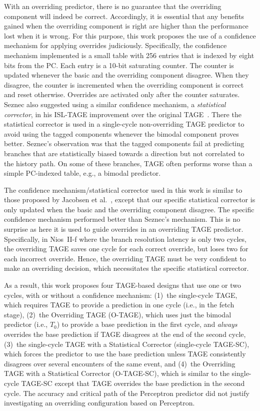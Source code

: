 \documentclass[conference]{IEEEtran}
\begin{document}
With an overriding predictor, there is no guarantee that the overriding component will indeed be correct. Accordingly, it is essential that any benefits gained when the overriding component is right are higher than the performance lost when it is wrong. For this purpose, this work proposes the use of a confidence mechanism for applying overrides judiciously. Specifically, the confidence mechanism implemented is a small table with 256 entries that is indexed by eight bits from the PC. Each entry is a 10-bit saturating counter.  The counter is updated whenever the basic and the overriding component disagree. When they disagree, the counter is incremented when the overriding component is correct and reset otherwise. Overrides are activated only after the counter saturates. Seznec also suggested using a similar confidence mechanism, a \textit{statistical corrector}, in his ISL-TAGE improvement over the original TAGE~\cite{isltage}.  There the statistical corrector is used in a single-cycle non-overriding TAGE predictor to avoid using the tagged components whenever the bimodal component proves better.  Seznec's observation was that the tagged components fail at predicting branches that are statistically biased towards a direction but not correlated to the history path. On some of these branches, TAGE often performs worse than a simple PC-indexed table, e.g., a bimodal predictor.

The confidence mechanism/statistical corrector used in this work is similar to those proposed by Jacobsen et al.~\cite{confidence}, except that our specific statistical corrector is only updated when the basic and the overriding component disagree. The specific confidence mechanism performed better than Seznec's mechanism. This is no surprise as here it is used to guide overrides in an overriding TAGE predictor.
Specifically, in Nios~II-f where the branch resolution latency is only two cycles, the overriding TAGE saves one cycle for each correct override, but loses two for each incorrect override. 
Hence, the overriding TAGE must be very confident to make an overriding decision, which necessitates the specific statistical corrector.

As a result, this work proposes four TAGE-based designs that use one or two cycles, with or without a confidence mechanism:  (1)~the single-cycle TAGE, which requires TAGE to provide a prediction in one cycle (i.e., in the fetch stage), (2)~the Overriding TAGE (\mbox{O-TAGE}), which uses just the bimodal predictor (i.e., $T_0$) to provide a base prediction in the first cycle, and \textit{always} overrides the base prediction if TAGE disagrees at the end of the second cycle, (3)~the single-cycle TAGE with a Statistical Corrector (single-cycle \mbox{TAGE-SC}), which forces the predictor to use the base prediction unless TAGE consistently disagrees over several encounters of the same event, and (4)~the Overriding TAGE with a Statistical Corrector (\mbox{O-TAGE-SC}), which is similar to the single-cycle \mbox{TAGE-SC} except that TAGE overrides the base prediction in the second cycle. The accuracy and critical path of the Perceptron predictor did not justify investigating an overriding configuration based on Perceptron.
\end{document}
